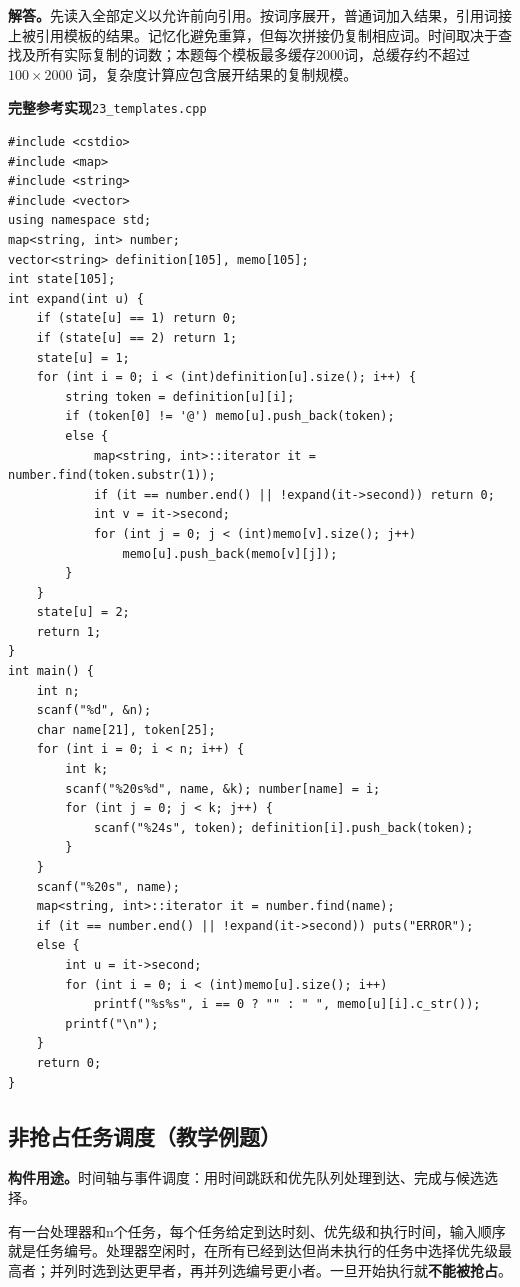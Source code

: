 \documentclass[UTF8,11pt,a4paper,fontset=none]{ctexart}
\begin{document}
\noindent\textbf{解答。}先读入全部定义以允许前向引用。按词序展开，普通词加入结果，引用词接上被引用模板的结果。记忆化避免重算，但每次拼接仍复制相应词。时间取决于查找及所有实际复制的词数；本题每个模板最多缓存2000词，总缓存约不超过 $100\times2000$ 词，复杂度计算应包含展开结果的复制规模。
\par\noindent\begin{minipage}{\linewidth}
\textbf{完整参考实现}\quad\texttt{23\_templates.cpp}
\begin{lstlisting}
#include <cstdio>
#include <map>
#include <string>
#include <vector>
using namespace std;
map<string, int> number;
vector<string> definition[105], memo[105];
int state[105];
int expand(int u) {
    if (state[u] == 1) return 0;
    if (state[u] == 2) return 1;
    state[u] = 1;
    for (int i = 0; i < (int)definition[u].size(); i++) {
        string token = definition[u][i];
        if (token[0] != '@') memo[u].push_back(token);
        else {
            map<string, int>::iterator it = number.find(token.substr(1));
            if (it == number.end() || !expand(it->second)) return 0;
            int v = it->second;
            for (int j = 0; j < (int)memo[v].size(); j++)
                memo[u].push_back(memo[v][j]);
        }
    }
    state[u] = 2;
    return 1;
}
int main() {
    int n;
    scanf("%d", &n);
    char name[21], token[25];
    for (int i = 0; i < n; i++) {
        int k;
        scanf("%20s%d", name, &k); number[name] = i;
        for (int j = 0; j < k; j++) {
            scanf("%24s", token); definition[i].push_back(token);
        }
    }
    scanf("%20s", name);
    map<string, int>::iterator it = number.find(name);
    if (it == number.end() || !expand(it->second)) puts("ERROR");
    else {
        int u = it->second;
        for (int i = 0; i < (int)memo[u].size(); i++)
            printf("%s%s", i == 0 ? "" : " ", memo[u][i].c_str());
        printf("\n");
    }
    return 0;
}
\end{lstlisting}
\end{minipage}\par


\subsection{非抢占任务调度（教学例题）}
\noindent\textbf{构件用途。}时间轴与事件调度：用时间跳跃和优先队列处理到达、完成与候选选择。

有一台处理器和n个任务，每个任务给定到达时刻、优先级和执行时间，输入顺序就是任务编号。处理器空闲时，在所有已经到达但尚未执行的任务中选择优先级最高者；并列时选到达更早者，再并列选编号更小者。一旦开始执行就\textbf{不能被抢占}。
\end{document}
